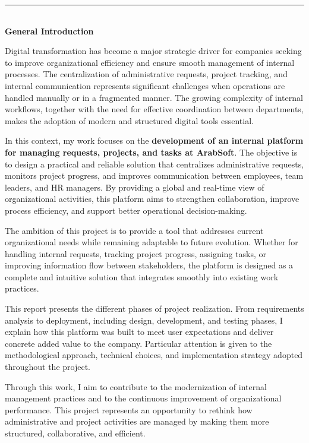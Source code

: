 \newpage
\thispagestyle{plain}

{}

\begin{center}
  \rule{\linewidth}{1.2pt}\\[0.4cm]
  {\fontsize{20}{24}\selectfont \textbf{General Introduction}}\\[0.5cm]
\end{center}
\vspace{0.8cm}

{\fontsize{12}{16}\selectfont
\setlength{\parindent}{1.2cm}
\setlength{\parskip}{6pt}

\indent Digital transformation has become a major strategic driver for companies seeking to improve organizational efficiency and ensure smooth management of internal processes. The centralization of administrative requests, project tracking, and internal communication represents significant challenges when operations are handled manually or in a fragmented manner. The growing complexity of internal workflows, together with the need for effective coordination between departments, makes the adoption of modern and structured digital tools essential.

\indent In this context, my work focuses on the \textbf{development of an internal platform for managing requests, projects, and tasks at ArabSoft}. The objective is to design a practical and reliable solution that centralizes administrative requests, monitors project progress, and improves communication between employees, team leaders, and HR managers. By providing a global and real-time view of organizational activities, this platform aims to strengthen collaboration, improve process efficiency, and support better operational decision-making.

\indent The ambition of this project is to provide a tool that addresses current organizational needs while remaining adaptable to future evolution. Whether for handling internal requests, tracking project progress, assigning tasks, or improving information flow between stakeholders, the platform is designed as a complete and intuitive solution that integrates smoothly into existing work practices.

\indent This report presents the different phases of project realization. From requirements analysis to deployment, including design, development, and testing phases, I explain how this platform was built to meet user expectations and deliver concrete added value to the company. Particular attention is given to the methodological approach, technical choices, and implementation strategy adopted throughout the project.

\indent Through this work, I aim to contribute to the modernization of internal management practices and to the continuous improvement of organizational performance. This project represents an opportunity to rethink how administrative and project activities are managed by making them more structured, collaborative, and efficient.
}
